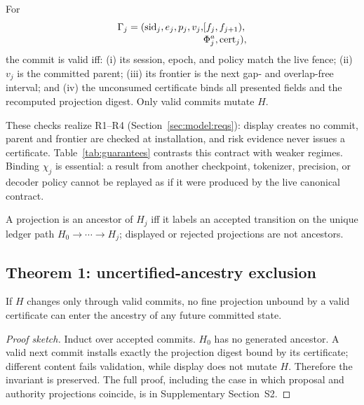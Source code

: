 \begin{definition}\label{def:commit}
For
\[
\begin{aligned}
 \Gamma_j=(\mathrm{sid}_j,e_j,p_j,v_j,&[f_j,f_{j+1}),\\[-2pt]
 &\Phi_j^a,\mathrm{cert}_j),
\end{aligned}
\]
the commit is valid iff: (i) its session, epoch, and policy match the
live fence; (ii) $v_j$ is the committed parent; (iii) its frontier is the next
gap- and overlap-free interval; and (iv) the unconsumed certificate binds all
presented fields and the recomputed projection digest. Only valid commits
mutate $H$.
\end{definition}

These checks realize R1--R4 (Section~\ref{sec:model:reqs}): display creates no
commit, parent and frontier are checked at installation, and risk evidence
never issues a certificate. Table~\ref{tab:guarantees} contrasts this contract
with weaker regimes. Binding $\chi_j$ is essential: a result from another
checkpoint, tokenizer, precision, or decoder policy cannot be replayed as if it
were produced by the live canonical contract.


\begin{definition}\label{def:ancestry}
A projection is an ancestor of $H_j$ iff it labels an accepted transition on
the unique ledger path $H_0\rightarrow\cdots\rightarrow H_j$; displayed or
rejected projections are not ancestors.
\end{definition}

\subsection{Theorem 1: uncertified-ancestry exclusion}\label{sec:dgft:thm1}

\begin{theorem}\label{thm:ancestry}
If $H$ changes only through valid commits, no fine projection unbound by a
valid certificate can enter the ancestry of any future committed state.
\end{theorem}

\begin{proof}[Proof sketch]
Induct over accepted commits. $H_0$ has no generated ancestor. A valid next
commit installs exactly the projection digest bound by its certificate;
different content fails validation, while display does not mutate $H$.
Therefore the invariant is preserved. The full proof, including the case in
which proposal and authority projections coincide, is in Supplementary
Section~S2.
\end{proof}

